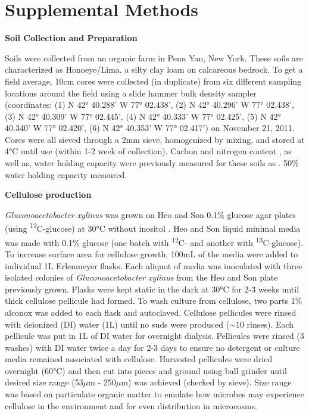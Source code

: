 \section{Supplemental Methods}


\textbf{Soil Collection and Preparation}



Soils were collected from an organic farm in Penn Yan, New York.  These soils are characterized as Honoeye/Lima, a silty clay loam on calcareous bedrock. To get a field average, 10cm cores were collected (in duplicate) from six different sampling locations around the field using a slide hammer bulk density sampler (coordinates: (1) N 42° 40.288’ W 77° 02.438’, (2) N 42° 40.296’ W 77° 02.438’, (3) N 42° 40.309’ W 77° 02.445’, (4) N 42° 40.333’ W 77° 02.425’, (5) N 42° 40.340’ W 77° 02.420’, (6) N 42° 40.353’ W 77° 02.417’) on November 21, 2011.   Cores were all sieved through a 2mm sieve, homogenized by mixing, and stored at 4°C until use (within 1-2 week of collection).  Carbon and nitrogen content , as well as, water holding capacity were previously measured for these soils as .  
50\% water holding capacity measured. 



\textbf{Cellulose production}



\textit{Gluconoacetobacter xylinus} was grown on Heo and Son 0.1\% glucose agar plates (using \textsuperscript{12}C-glucose) at 30°C without inositol \cite{Heo_2002}.  Heo and Son liquid minimal media was made with 0.1\% glucose (one batch with \textsuperscript{12}C- and another with \textsuperscript{13}C-glucose). To increase surface area for cellulose growth, 100mL of the media were added to individual 1L Erlenmeyer flasks. Each aliquot of media was inoculated with three isolated colonies of \textit{Gluconoacetobacter xylinus} from the Heo and Son plate previously grown.  Flasks were kept static in the dark at 30°C for 2-3 weeks until thick cellulose pellicule had formed.  To wash culture from cellulose, two parts 1\% alconox was added to each flask and autoclaved. Cellulose pellicules were rinsed with deionized (DI) water (1L) until no suds were produced ($\sim$10 rinses). Each pellicule was put in 1L of DI water for overnight dialysis.  Pellicules were rinsed (3 washes) with DI water twice a day for 2-3 days to ensure no detergent or culture media remained associated with cellulose. Harvested pellicules were dried overnight (60°C) and then cut into pieces and ground using ball grinder until desired size range (53$\mu$m - 250$\mu$m) was achieved (checked by sieve). Size range was based on particulate organic matter to emulate how microbes may experience cellulose in the environment \cite{Cambardella_1992} and for even distribution in microcosms. 


